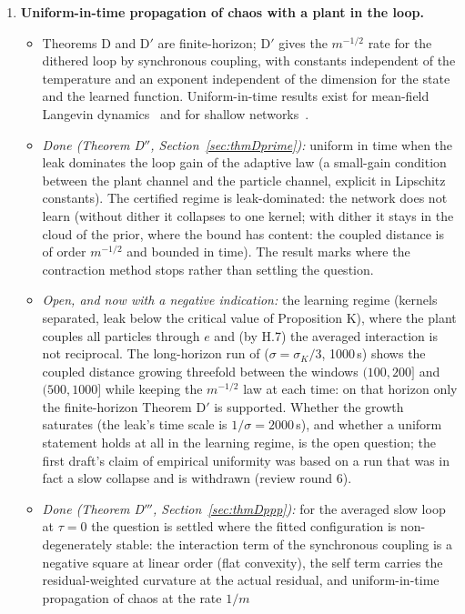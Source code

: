 \begin{enumerate}[label=\arabic*.,leftmargin=*]
\item \textbf{Uniform-in-time propagation of chaos with a plant in the loop.}
  \begin{itemize}
    \item Theorems D and D$'$ are finite-horizon; D$'$ gives the $m^{-1/2}$ rate for the dithered loop by synchronous
      coupling, with constants independent of the temperature and an exponent independent of the dimension for the
      state and the learned function. Uniform-in-time results exist for mean-field Langevin dynamics~\cite{S5} and
      for shallow networks~\cite{R36}.
    \item \emph{Done (Theorem D$''$, Section~\ref{sec:thmDprime}):} uniform in time when the leak dominates the loop
      gain of the adaptive law (a small-gain condition between the plant channel and the particle channel, explicit in
      Lipschitz constants). The certified regime is leak-dominated: the network does not learn (without dither it
      collapses to one kernel; with dither it stays in the cloud of the prior, where the bound has content: the
      coupled distance is of order $m^{-1/2}$ and bounded in time). The result marks where the contraction method
      stops rather than settling the question.
    \item \emph{Open, and now with a negative indication:} the learning regime (kernels separated, leak below the
      critical value of Proposition K), where the plant couples all particles through $e$ and (by H.7) the averaged
      interaction is not reciprocal. The long-horizon run of  ($\sigma = \sigma_K/3$,
      1000\,s) shows the coupled distance growing threefold between the windows $(100,200]$ and $(500,1000]$ while
      keeping the $m^{-1/2}$ law at each time: on that horizon only the finite-horizon Theorem D$'$ is supported.
      Whether the growth saturates (the leak's time scale is $1/\sigma = 2000$\,s), and whether a uniform statement
      holds at all in the learning regime, is the open question; the first draft's claim of empirical uniformity was
      based on a run that was in fact a slow collapse and is withdrawn (review round 6).
    \item \emph{Done (Theorem D$'''$, Section~\ref{sec:thmDppp}):} for the averaged slow loop at $\tau = 0$ the
      question is settled where the fitted configuration is non-degenerately stable: the interaction term of the
      synchronous coupling is a negative square at linear order (flat convexity), the self term carries the
      residual-weighted curvature at the actual residual, and uniform-in-time propagation of chaos at the rate $1/m$

\end{itemize}
\end{enumerate}
